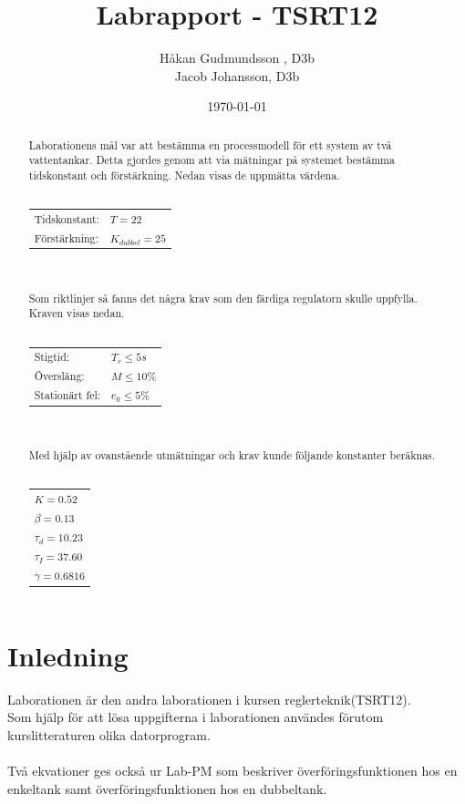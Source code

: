 \documentclass[a4paper]{article}
\title{Labrapport - TSRT12}
\author{Håkan Gudmundsson , D3b \\ Jacob Johansson, D3b}
\date{\today}
\begin{document}
\maketitle
\thispagestyle{empty}
\newpage

\begin{abstract}

Laborationens mål var att bestämma en processmodell för ett system av två vattentankar.
Detta gjordes genom att via mätningar på systemet bestämma tidskonstant och förstärkning.
Nedan visas de uppmätta värdena.
\\\\
\begin{tabular}{l l}
  Tidskonstant: & $T = 22$ \\
  Förstärkning: & $K_{dubbel} = 25$ 
\end{tabular}
\\\\
Som riktlinjer så fanns det några krav som den färdiga regulatorn skulle uppfylla.
Kraven visas nedan.
\\\\
\begin{tabular}{l l}
  Stigtid: & $T_{r} \leq 5s$ \\
  Översläng: & $M \leq 10\%$ \\
  Stationärt fel: & $e_{0} \leq 5\% $ 
\end{tabular}
\\\\
Med hjälp av ovanstående utmätningar och krav kunde följande konstanter beräknas.
\\\\
\begin{tabular}{l}
  $K = 0.52$ \\
  $\beta = 0.13$ \\
  $\tau_{d} = 10.23$ \\
  $\tau_{I} = 37.60$ \\
  $\gamma = 0.6816$ 
\end{tabular}
\end{abstract}
\thispagestyle{empty}
\newpage

\setcounter{page}{0}
\tableofcontents
\thispagestyle{empty}
\newpage

\setcounter{page}{1}
\section{Inledning}

Laborationen är den andra laborationen i kursen reglerteknik(TSRT12). \\
Som hjälp för att lösa uppgifterna i laborationen användes förutom kurslitteraturen olika datorprogram. 
\\\\
Två ekvationer ges också ur Lab-PM som beskriver överföringsfunktionen hos en enkeltank samt överföringsfunktionen hos en dubbeltank.
\end{document}
